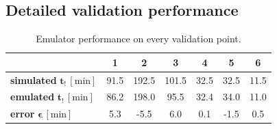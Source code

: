 \subsection{Detailed validation performance}
\begin{table}[H]
  \centering
  \caption{Emulator performance on every validation point.}
  \label{tab:validation_performance}
  \begin{tabular}{lcccccc}
    \toprule
     & \textbf{1} & \textbf{2} & \textbf{3} & \textbf{4} & \textbf{5} & \textbf{6}\\
    \midrule
    \textbf{simulated} $\bm{t_!}\,[\si{\minute}]$     & 91.5 & 192.5 & 101.5 & 32.5 & 32.5 & 11.5\\
    \textbf{emulated}  $\bm{t_!}\,[\si{\minute}]$     & 86.2 & 198.0 & 95.5  & 32.4 & 34.0 & 11.0\\
    \textbf{error}     $\bm{\epsilon}\,[\si{\minute}]$ & 5.3  & -5.5  & 6.0   & 0.1  & -1.5 & 0.5\\
    \bottomrule
  \end{tabular}
\end{table}
